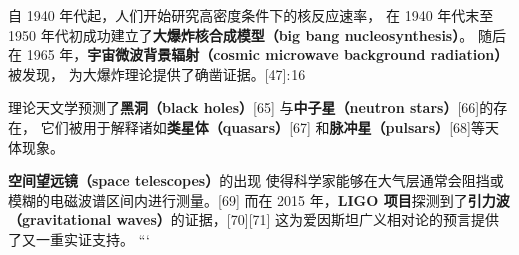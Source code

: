 自 1940 年代起，人们开始研究高密度条件下的核反应速率，  
在 1940 年代末至 1950 年代初成功建立了\textbf{大爆炸核合成模型（big bang nucleosynthesis）}。  
随后在 1965 年，\textbf{宇宙微波背景辐射（cosmic microwave background radiation）}被发现，  
为大爆炸理论提供了确凿证据。[47]: 16   

理论天文学预测了\textbf{黑洞（black holes）}[65]  
与\textbf{中子星（neutron stars）}[66]的存在，  
它们被用于解释诸如\textbf{类星体（quasars）}[67]  
和\textbf{脉冲星（pulsars）}[68]等天体现象。  

\textbf{空间望远镜（space telescopes）}的出现  
使得科学家能够在大气层通常会阻挡或模糊的电磁波谱区间内进行测量。[69]  
而在 2015 年，\textbf{LIGO 项目}探测到了\textbf{引力波（gravitational waves）}的证据，[70][71]  
这为爱因斯坦广义相对论的预言提供了又一重实证支持。
```
